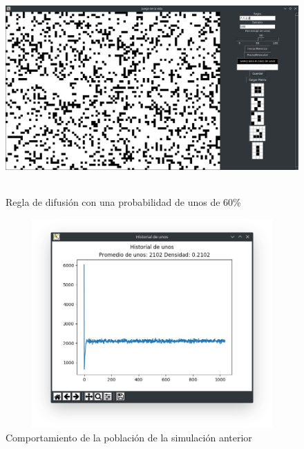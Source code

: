 \begin{figure}[H]
\begin{center}
 \includegraphics[width=12cm, height=8cm]{./img/diffusion60.png}
 \caption{Regla de difusión con una probabilidad de unos de 60\%}
 \label{fig:diffusion60}
\end{center}
\end{figure}

\begin{figure}[H]
\begin{center}
 \includegraphics[width=12cm, height=8cm]{./img/diffusion60grafica.png}
 \caption{Comportamiento de la población de la simulación anterior}
 \label{fig:diffusion60grafica}
\end{center}
\end{figure}

